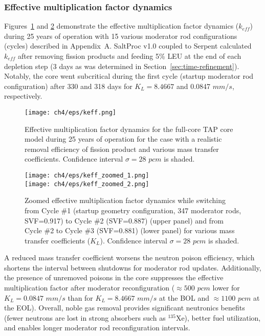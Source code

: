 \subsubsection{Effective multiplication factor dynamics}
Figures~\ref{fig:keff-eps-var} and \ref{fig:keff-eps-var-zoom} demonstrate the 
effective multiplication factor dynamics ($k_{eff}$) 
during 25 years of operation with 15 various moderator rod configurations 
(cycles) described in Appendix~A. SaltProc v1.0 
coupled to Serpent calculated 
$k_{eff}$ after removing fission products and feeding 5\% \gls{LEU} at the end 
of each depletion step (3 days as was determined in 
Section~\ref{sec:time-refinement}). Notably, the core went subcritical during 
the first cycle (startup moderator rod configuration) after 330 and 318 days 
for $K_L=8.4667$ and 0.0847 $mm/s$, respectively. 
\begin{figure}[htp!] %
	\centering
	\texttt{[image: ch4/eps/keff.png]}
	\caption{Effective multiplication factor dynamics for the full-core 
		\gls{TAP} core model during 25 years of operation for the case with a 
		realistic removal efficiency of fission product and various mass 
		transfer 
		coefficients. Confidence interval $\sigma=28$ $pcm$ is shaded.}
	\label{fig:keff-eps-var}
\end{figure}
\begin{figure}[htbp!] %
	\centering
	\texttt{[image: ch4/eps/keff\_zoomed\_1.png]}\\
	\vspace{-8mm}
	\hspace{+1mm}
	\texttt{[image: ch4/eps/keff\_zoomed\_2.png]}
	\vspace{-3mm}
	\caption{Zoomed effective multiplication factor dynamics while switching
		from Cycle \#1 (startup geometry configuration, 347 moderator rods, 
		\gls{SVF}=0.917) to Cycle \#2 (\gls{SVF}=0.887) (upper panel) and
		from Cycle \#2 to  Cycle \#3 (\gls{SVF}=0.881) 
		(lower panel) for various mass transfer coefficients ($K_L$). 
		Confidence interval $\sigma=28$ $pcm$ is shaded.}
	\label{fig:keff-eps-var-zoom}
\end{figure}

A reduced mass transfer coefficient worsens the neutron poison efficiency, 
which shortens the interval between 
shutdowns for moderator rod updates. Additionally, the presence of unremoved 
poisons in the core suppresses the effective multiplication factor after 
moderator reconfiguration ($\approx500$ $pcm$ lower for $K_L=0.0847$ $mm/s$ 
than for $K_L=8.4667$ $mm/s$ at the \gls{BOL} and $\approx1100$ $pcm$ at 
the \gls{EOL}). Overall, noble gas removal provides significant neutronics 
benefits (fewer neutrons are lost in strong absorbers such as 
$^{135}$Xe), better fuel utilization, and enables longer moderator rod 
reconfiguration intervals.

